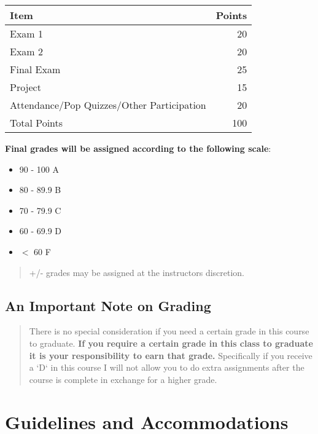 \documentclass[11pt]{article}
\begin{document}
\begin{center}


\begin{center}
\begin{tabular}{lr}
Item & Points\\
\hline
Exam 1 & 20\\
Exam 2 & 20\\
Final Exam & 25\\
Project & 15\\
Attendance/Pop Quizzes/Other Participation & 20\\
\hline
Total Points & 100\\
\hline
\end{tabular}
\end{center}
\end{center}

\begin{center}
\textbf{\textbf{Final grades will be assigned according to the following scale}}:
\end{center}

\begin{itemize}
\item 90 - 100 A
\item 80 - 89.9 B
\item 70 - 79.9 C
\item 60 - 69.9 D
\item \(<\) 60 F
\end{itemize}

\begin{quote}
+/- grades may be assigned at the instructors discretion.
\end{quote}

\subsection{An Important Note on Grading}
\label{sec:org3c93891}

\begin{quote}
There is no special consideration if you need a certain grade in this course to graduate.  \textbf{\textbf{If you require a certain grade in this class to graduate it is your responsibility to earn that grade.}} Specifically if you receive a `D` in this course I will not allow you to do extra assignments after the course is complete in exchange for a higher grade. 
\end{quote}


\section{Guidelines and Accommodations}
\label{sec:orgeb74793}
\end{document}
